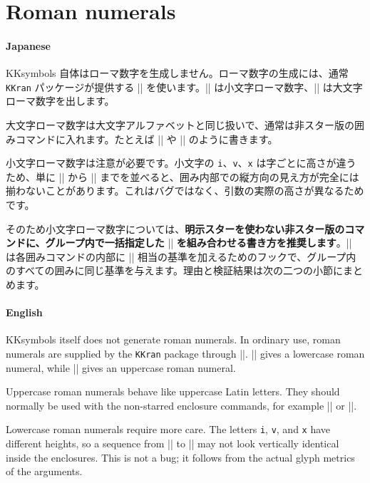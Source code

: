 \documentclass[luatex,fontsize=8pt,paper=b5,twoside]{jlreq}%
\begin{document}
\section{Roman numerals}
\paragraph{Japanese}
KKsymbols 自体はローマ数字を生成しません。ローマ数字の生成には、通常 \texttt{KKran} パッケージが提供する \KKverb|\Rrnum| を使います。\KKverb|| は小文字ローマ数字、\KKverb|| は大文字ローマ数字を出します。

大文字ローマ数字は大文字アルファベットと同じ扱いで、通常は非スター版の囲みコマンドに入れます。たとえば \KKverb|| や \KKverb|| のように書きます。

小文字ローマ数字は注意が必要です。小文字の \verb|i|、\verb|v|、\verb|x| は字ごとに高さが違うため、単に \KKverb|| から \KKverb|| までを並べると、囲み内部での縦方向の見え方が完全には揃わないことがあります。これはバグではなく、引数の実際の高さが異なるためです。

そのため小文字ローマ数字については、\textbf{明示スターを使わない非スター版のコマンドに、グループ内で一括指定した} \KKverb|| \textbf{を組み合わせる書き方を推奨します}。\KKverb|\kksref| は各囲みコマンドの内部に \KKverb|| 相当の基準を加えるためのフックで、グループ内のすべての囲みに同じ基準を与えます。理由と検証結果は次の二つの小節にまとめます。

\paragraph{English}
KKsymbols itself does not generate roman numerals. In ordinary use, roman numerals are supplied by the \texttt{KKran} package through \KKverb|\Rrnum|. \KKverb|| gives a lowercase roman numeral, while \KKverb|| gives an uppercase roman numeral.

Uppercase roman numerals behave like uppercase Latin letters. They should normally be used with the non-starred enclosure commands, for example \KKverb|| or \KKverb||.

Lowercase roman numerals require more care. The letters \verb|i|, \verb|v|, and \verb|x| have different heights, so a sequence from \KKverb|| to \KKverb|| may not look vertically identical inside the enclosures. This is not a bug; it follows from the actual glyph metrics of the arguments.
\end{document}
